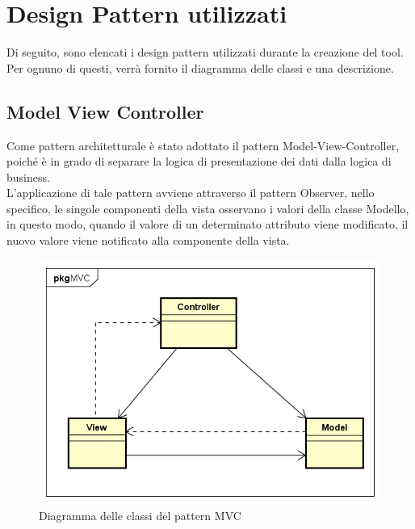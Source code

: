 \section{Design Pattern utilizzati}\label{sec:design-pattern-utilizzati}
Di seguito, sono elencati i design pattern utilizzati durante la creazione del tool. Per ognuno di questi, verrà fornito il diagramma delle classi e una descrizione.
\subsection{Model View Controller}\label{subsec:model-view-controller}
Come pattern architetturale è stato adottato il pattern Model-View-Controller, poiché è in grado di separare la logica di presentazione dei dati dalla logica di business.\\
L'applicazione di tale pattern avviene attraverso il pattern Observer, nello specifico, le singole componenti della vista osservano i valori della classe Modello, in questo modo, quando il valore di un determinato attributo viene modificato, il nuovo valore viene notificato alla componente della vista.
\begin{figure}[H]
    \centering
    \includegraphics[width=13cm, height=8cm]{./immagini/diagrammi_uml/mvc.png}
    \caption{Diagramma delle classi del pattern MVC}\label{fig:mvc}
\end{figure}

\newpage
